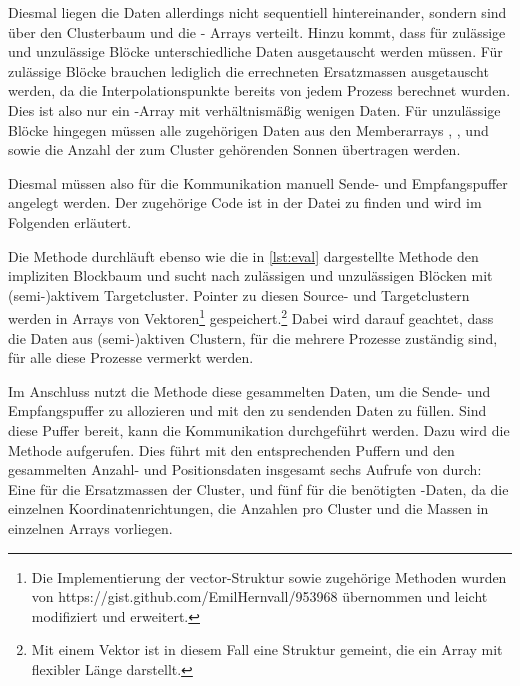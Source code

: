     Diesmal liegen die Daten allerdings nicht sequentiell hintereinander, sondern sind über den Clusterbaum und die - Arrays verteilt. Hinzu kommt, dass für zulässige und unzulässige
    Blöcke unterschiedliche Daten ausgetauscht werden müssen. Für zulässige Blöcke brauchen lediglich die errechneten Ersatzmassen ausgetauscht werden, da die Interpolationspunkte bereits von jedem 
    Prozess berechnet wurden. Dies ist also nur ein -Array mit verhältnismäßig wenigen Daten.
    Für unzulässige Blöcke hingegen müssen alle zugehörigen Daten aus den Memberarrays , ,  und  sowie die Anzahl der zum Cluster gehörenden
    Sonnen übertragen werden.
    
    Diesmal müssen also für die Kommunikation manuell Sende- und Empfangspuffer angelegt werden. Der zugehörige Code ist in der Datei  zu finden und wird im Folgenden erläutert.
    
    Die Methode  durchläuft ebenso wie die in \autoref{lst:eval} dargestellte Methode  den impliziten Blockbaum und sucht nach 
    zulässigen und unzulässigen Blöcken mit (semi-)aktivem Targetcluster. Pointer zu diesen Source- und Targetclustern werden in Arrays von Vektoren\footnote{Die Implementierung der vector-Struktur
    sowie zugehörige Methoden wurden von https://\-gist.\-github.com/\-EmilHernvall/953968 übernommen und leicht modifiziert und erweitert.} gespeichert.\footnote{Mit einem Vektor ist in diesem Fall 
    eine Struktur gemeint, die ein Array mit flexibler Länge darstellt.} Dabei wird darauf geachtet, dass die Daten aus (semi-)aktiven Clustern, für die mehrere Prozesse zuständig sind, für alle diese 
    Prozesse vermerkt werden.
    
    Im Anschluss nutzt die Methode  diese gesammelten Daten, um die Sende- und Empfangspuffer zu allozieren und mit den zu sendenden Daten zu füllen. Sind diese Puffer bereit,
    kann die Kommunikation durchgeführt werden. Dazu wird die Methode  aufgerufen. Dies führt mit den entsprechenden Puffern und den gesammelten Anzahl- und Positionsdaten
    insgesamt sechs Aufrufe von  durch: Eine für die Ersatzmassen der Cluster, und fünf für die benötigten -Daten, da die einzelnen Koordinatenrichtungen, die 
    Anzahlen pro Cluster und die Massen in einzelnen Arrays vorliegen.
    
